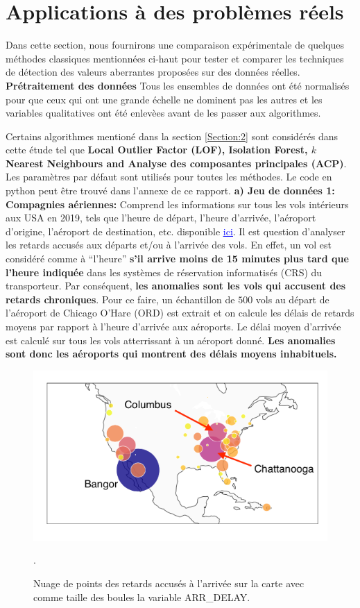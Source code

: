 
\section{Applications à des problèmes réels}\label{Section:6}

Dans cette section, nous fournirons une comparaison expérimentale de quelques méthodes classiques  mentionnées ci-haut  pour tester et comparer les techniques de détection des valeurs aberrantes proposées sur des données réelles.
\noindent\textbf{Prétraitement des données} Tous les ensembles de données ont été normalisés pour que ceux qui ont une grande échelle ne dominent pas les autres et les variables qualitatives ont été enlevèes avant de les passer aux algorithmes.

\noindent Certains algorithmes mentioné dans la section \ref{Section:2} sont considérés dans cette étude tel que \textbf{Local Outlier Factor (LOF), Isolation Forest, $k$ Nearest Neighbours and Analyse des composantes principales (ACP)}. Les paramètres par défaut sont utilisés pour toutes les méthodes. Le code en python peut être trouvé dans l'annexe de ce rapport. \newl
\noindent \textbf{a) Jeu de données 1: Compagnies aériennes:} Comprend les informations sur tous les vols intérieurs aux USA  en 2019, tels que l'heure de départ, l'heure d'arrivée, l'aéroport d'origine, l'aéroport de destination, etc. disponible  \href{https://www.transtats.bts.gov/DL_SelectFields.asp?Table_ID=}{\textcolor{blue}{\underline{ici}}}. Il est question d’analyser les retards accusés aux  départs et/ou à l’arrivée des vols. En effet, un vol est considéré comme à “l’heure”  \textbf{s’il arrive moins de 15 minutes plus tard que l'heure indiquée} dans les systèmes de réservation informatisés (CRS) du transporteur. Par conséquent, \textbf{les anomalies sont les vols qui accusent des retards chroniques}. Pour ce faire,  un échantillon de $500$ vols au départ de l’aéroport de Chicago O’Hare (ORD) est extrait et on calcule les délais de retards moyens par rapport à l'heure d'arrivée aux aéroports. Le délai moyen d’arrivée est calculé sur tous les vols atterrissant à un aéroport donné.\textbf{ Les anomalies sont donc les aéroports qui montrent des délais moyens inhabituels.}
\begin{figure}[H]
    \centering
    \includegraphics[width=.50\textwidth]{ADOA/Images/vols1.png}
    \caption{Nuage de points des retards accusés à l'arrivée sur la carte avec comme taille des boules la variable ARR\_DELAY.}%
    \label{fig20}.
\end{figure}

